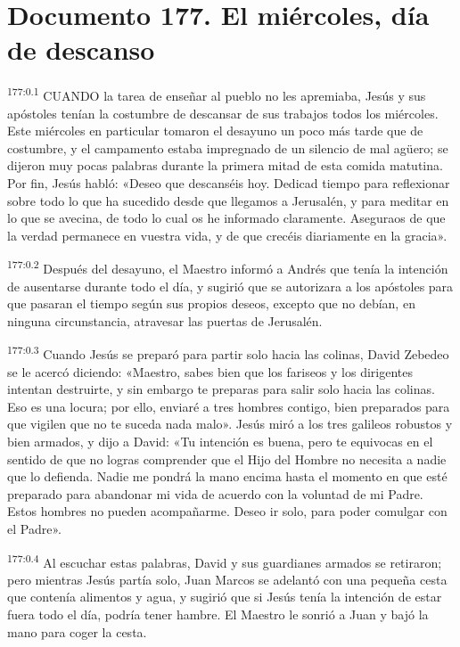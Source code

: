 \chapter{Documento 177. El miércoles, día de descanso}
\par
\textsuperscript{177:0.1} CUANDO la tarea de enseñar al pueblo no les apremiaba, Jesús y sus apóstoles tenían la costumbre de descansar de sus trabajos todos los miércoles. Este miércoles en particular tomaron el desayuno un poco más tarde que de costumbre, y el campamento estaba impregnado de un silencio de mal ag\"uero; se dijeron muy pocas palabras durante la primera mitad de esta comida matutina. Por fin, Jesús habló: «Deseo que descanséis hoy. Dedicad tiempo para reflexionar sobre todo lo que ha sucedido desde que llegamos a Jerusalén, y para meditar en lo que se avecina, de todo lo cual os he informado claramente. Aseguraos de que la verdad permanece en vuestra vida, y de que crecéis diariamente en la gracia».

\par
\textsuperscript{177:0.2} Después del desayuno, el Maestro informó a Andrés que tenía la intención de ausentarse durante todo el día, y sugirió que se autorizara a los apóstoles para que pasaran el tiempo según sus propios deseos, excepto que no debían, en ninguna circunstancia, atravesar las puertas de Jerusalén.

\par
\textsuperscript{177:0.3} Cuando Jesús se preparó para partir solo hacia las colinas, David Zebedeo se le acercó diciendo: «Maestro, sabes bien que los fariseos y los dirigentes intentan destruirte, y sin embargo te preparas para salir solo hacia las colinas. Eso es una locura; por ello, enviaré a tres hombres contigo, bien preparados para que vigilen que no te suceda nada malo». Jesús miró a los tres galileos robustos y bien armados, y dijo a David: «Tu intención es buena, pero te equivocas en el sentido de que no logras comprender que el Hijo del Hombre no necesita a nadie que lo defienda. Nadie me pondrá la mano encima hasta el momento en que esté preparado para abandonar mi vida de acuerdo con la voluntad de mi Padre. Estos hombres no pueden acompañarme. Deseo ir solo, para poder comulgar con el Padre».

\par
\textsuperscript{177:0.4} Al escuchar estas palabras, David y sus guardianes armados se retiraron; pero mientras Jesús partía solo, Juan Marcos se adelantó con una pequeña cesta que contenía alimentos y agua, y sugirió que si Jesús tenía la intención de estar fuera todo el día, podría tener hambre. El Maestro le sonrió a Juan y bajó la mano para coger la cesta.

